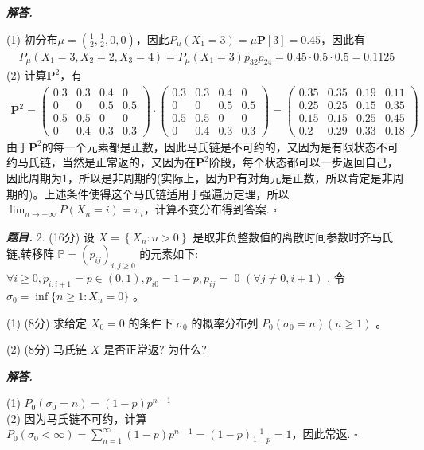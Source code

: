 \documentclass[10pt, a4paper, oneside]{ctexart}
\newenvironment{problem}{\begin{framed}\par\noindent\textbf{\textit{题目. }}}{\end{framed}\par}
\newenvironment{solution}{%
  \par\noindent\textbf{\textit{解答. }}\ignorespaces
}{%
  \hfill\ensuremath{\square}\par %
}
\begin{document}
\begin{solution}
    (1) 初分布$\mu=(\frac{1}{2},\frac{1}{2},0,0)$，因此$P_{\mu}(X_1=3)=\mu \mathbf{P}[3]=0.45$，因此有
    \begin{align*}
        P_{\mu}(X_1=3,X_2=2,X_3=4)=P_{\mu}(X_1=3)p_{32}p_{24}=0.45\cdot 0.5 \cdot 0.5=0.1125
    \end{align*}
    (2) 计算$\mathbf{P}^2$，有 
    \begin{align*}
        \mathbf{P}^2= \left( \begin{matrix} {0.3} & {0.3} & {0.4} & 0 \\  0 & 0 & {0.5} & {0.5} \\  {0.5} & {0.5} & 0 & 0 \\  0 & {0.4} & {0.3} & {0.3} \end{matrix}\right)  \cdot \left( \begin{matrix} {0.3} & {0.3} & {0.4} & 0 \\  0 & 0 & {0.5} & {0.5} \\  {0.5} & {0.5} & 0 & 0 \\  0 & {0.4} & {0.3} & {0.3} \end{matrix}\right) = \left( \begin{matrix} {0.35} & {0.35} & {0.19} & 0.11 \\  0.25 & 0.25 & {0.15} & {0.35} \\  {0.15} & {0.15} & 0.25 & 0.45 \\  0.2 & {0.29} & {0.33} & {0.18} \end{matrix}\right) 
    \end{align*}
    由于$\mathbf{P}^2$的每一个元素都是正数，因此马氏链是不可约的，又因为是有限状态不可约马氏链，当然是正常返的，又因为在$\mathbf{P}^2$阶段，每个状态都可以一步返回自己，因此周期为$1$，所以是非周期的(实际上，因为$\mathbf{P}$有对角元是正数，所以肯定是非周期的)。上述条件使得这个马氏链适用于强遍历定理，所以$\lim_{n\to +\infty}P(X_n=i)=\pi_i$，计算不变分布得到答案.
\end{solution}

\begin{problem}
    2. (16分) 设 \( X = \left\{  {{X}_{n} : n > 0}\right\}   \) 是取非负整数值的离散时间参数时齐马氏链,转移阵 \( \mathbb{P} = {\left( {p}_{ij}\right) }_{i,j \geq  0} \) 的元素如下: \( \forall i \geq  0,{p}_{i,i + 1} = p \in  \left( {0,1}\right) ,{p}_{i0} = 1 - p,{p}_{ij} =  \) 0  \( \left( {\forall j \neq  0,i + 1}\right)  \)  . 令  \( {\sigma }_{0} = \inf \{ n \geq  1 : {X}_{n} = 0\}  \)  。

(1) (8分) 求给定 \( {X}_{0} = 0 \) 的条件下 \( {\sigma }_{0} \) 的概率分布列 \( {P}_{0}\left( {{\sigma }_{0} = n}\right) \left( {n \geq  1}\right)  \) 。

(2) (8分) 马氏链 \( X \) 是否正常返? 为什么?
\end{problem}
\begin{solution}
    (1) $P_0(\sigma_0=n)=(1-p)p^{n-1}$\\
    (2) 因为马氏链不可约，计算$P_0(\sigma_0<\infty)=\sum_{n=1}^{\infty}(1-p)p^{n-1}=(1-p)\frac{1}{1-p}=1$，因此常返.
\end{solution}
\end{document}
